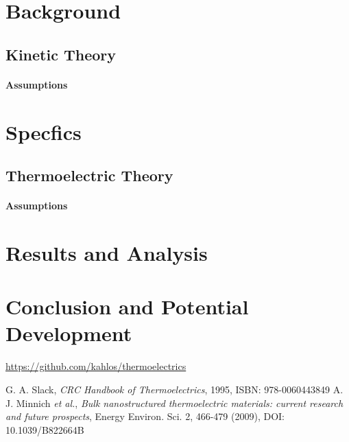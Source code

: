 \documentclass[12pt,titlepage,draft]{article}
\begin{document}
\section{Background}
\subsection{Kinetic Theory}
\paragraph{Assumptions}

\section{Specfics}
\subsection{Thermoelectric Theory}
\paragraph{Assumptions}

\section{Results and Analysis}

\section{Conclusion and Potential Development}

\url{https://github.com/kahlos/thermoelectrics}


\begin{thebibliography}{2}
G. A. Slack, \emph{CRC Handbook of Thermoelectrics}, 1995, ISBN: 978-0060443849
A. J. Minnich \emph{et al.}, \emph{Bulk nanostructured thermoelectric
materials: current research and future prospects}, Energy Environ.
Sci. 2, 466-479 (2009), DOI: 10.1039/B822664B
\end{thebibliography}
\end{document}
